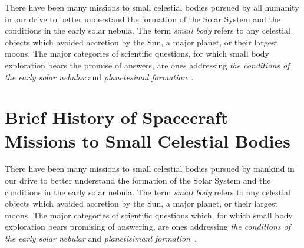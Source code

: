 \cite{Marks2022}


There have been many missions to small celestial bodies pursued by all humanity
in our drive to better understand the formation of the Solar System and the
conditions in the early solar nebula. The term \textit{small body} refers to any
celestial objects which avoided accretion by the Sun, a major planet, or their
largest moons. The major categories of scientific questions, for which
small body exploration bears the promise of answers, are ones addressing
\textit{the conditions of the early solar nebular} and \textit{planetesimal
formation}~\cite{Davidsson2021}.



%

\section{Brief History of Spacecraft Missions to Small Celestial Bodies}

There have been many missions to small celestial bodies pursued by mankind in
our drive to better understand the formation of the Solar System and the
conditions in the early solar nebula. The term \textit{small body} refers to any
celestial objects which avoided accretion by the Sun, a major planet, or their
largest moons. The major categories of scientific questions which, for which
small body exploration bears promising of answering, are ones addressing
\textit{the conditions of the early solar nebular} and \textit{planetisimanl
formation}~\cite{Davidsson2021}.